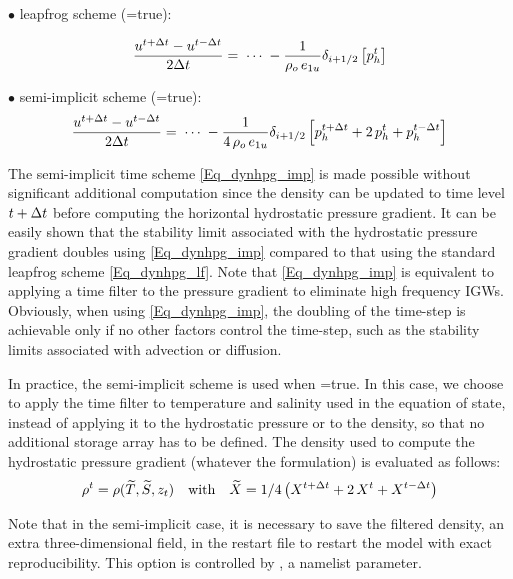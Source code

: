 \documentclass[NEMO_book]{subfiles}
\begin{document}
$\bullet$ leapfrog scheme (=true):

\begin{equation} \label{Eq_dynhpg_lf}
\frac{u^{t+\Delta t}-u^{t-\Delta t}}{2\Delta t} = \;\cdots \;
	-\frac{1}{\rho _o \,e_{1u} }\delta _{i+1/2} \left[ {p_h^t } \right]
\end{equation}

$\bullet$ semi-implicit scheme (=true):
\begin{equation} \label{Eq_dynhpg_imp}
\frac{u^{t+\Delta t}-u^{t-\Delta t}}{2\Delta t} = \;\cdots \;
	-\frac{1}{4\,\rho _o \,e_{1u} } \delta_{i+1/2} \left[ p_h^{t+\Delta t} +2\,p_h^t +p_h^{t-\Delta t}  \right]
\end{equation}

The semi-implicit time scheme \eqref{Eq_dynhpg_imp} is made possible without 
significant additional computation since the density can be updated to time level 
$t+\Delta t$ before computing the horizontal hydrostatic pressure gradient. It can 
be easily shown that the stability limit associated with the hydrostatic pressure 
gradient doubles using \eqref{Eq_dynhpg_imp} compared to that using the 
standard leapfrog scheme \eqref{Eq_dynhpg_lf}. Note that \eqref{Eq_dynhpg_imp} 
is equivalent to applying a time filter to the pressure gradient to eliminate high 
frequency IGWs. Obviously, when using \eqref{Eq_dynhpg_imp}, the doubling of 
the time-step is achievable only if no other factors control the time-step, such as 
the stability limits associated with advection or diffusion.

In practice, the semi-implicit scheme is used when =true. 
In this case, we choose to apply the time filter to temperature and salinity used in 
the equation of state, instead of applying it to the hydrostatic pressure or to the 
density, so that no additional storage array has to be defined. The density used to 
compute the hydrostatic pressure gradient (whatever the formulation) is evaluated 
as follows:
\begin{equation} \label{Eq_rho_flt}
	\rho^t = \rho( \widetilde{T},\widetilde {S},z_t)
 \quad	  \text{with}	\quad 
	\widetilde{X} = 1 / 4 \left(  X^{t+\Delta t} +2 \,X^t + X^{t-\Delta t}  \right)
\end{equation}

Note that in the semi-implicit case, it is necessary to save the filtered density, an 
extra three-dimensional field, in the restart file to restart the model with exact 
reproducibility. This option is controlled by  , a namelist parameter.
\end{document}
